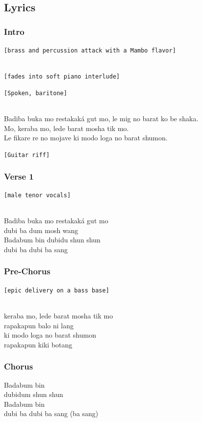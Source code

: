 \subsection{Lyrics}\label{lyrics-22}

\subsubsection{Intro}\label{intro-2}

\texttt{{[}brass\ and\ percussion\ attack\ with\ a\ Mambo\ flavor{]}}\strut \\
\texttt{{[}fades\ into\ soft\ piano\ interlude{]}}

\texttt{{[}Spoken,\ baritone{]}}\strut \\
Badiba buka mo restakaká gut mo, le mig no barat ko be shaka.\\
Mo, keraba mo, lede barat mosha tik mo.\\
Le fikare re no mojave ki modo loga no barat shumon.

\texttt{{[}Guitar\ riff{]}}

\subsubsection{Verse 1}\label{verse-1-18}

\texttt{{[}male\ tenor\ vocals{]}}\strut \\
Badiba buka mo restakaká gut mo\\
dubi ba dum mosh wang\\
Badabum bin dubidu shun shun\\
dubi ba dubi ba sang

\subsubsection{Pre-Chorus}\label{pre-chorus-27}

\texttt{{[}epic\ delivery\ on\ a\ bass\ base{]}}\strut \\
keraba mo, lede barat mosha tik mo\\
rapakapun balo ni lang\\
ki modo loga no barat shumon\\
rapakapun kiki botang

\subsubsection{Chorus}\label{chorus-46}

Badabum bin\\
dubidum shun shun\\
Badabum bin\\
dubi ba dubi ba sang (ba sang)

